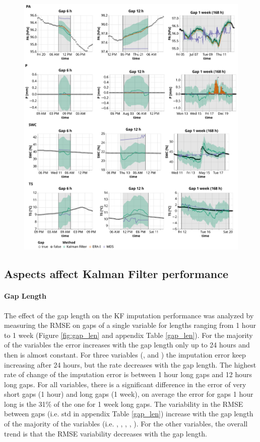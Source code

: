 \documentclass{article}
\let\Oldsubsection\subsection
\renewcommand{\subsection}{\FloatBarrier\Oldsubsection}
\begin{document}
\begin{figure}
\centerline{\includegraphics[width=5.7in]{timeseries_2}}
\caption{}
\label{fig:ts_1-2}
\end{figure}
\restoregeometry


\subsection{Aspects affect Kalman Filter performance}

\paragraph{Gap Length} The effect of the gap length on the KF imputation performance was analyzed by measuring the RMSE on gaps of a single variable for lengths ranging from 1 hour to 1 week (Figure \ref{fig:gap_len} and appendix Table \ref{gap_len}). For the majority of the variables the error increases with the gap length only up to 24 hours and then is almost constant. For three variables (,  and ) the imputation error keep increasing after 24 hours, but the rate decreases with the gap length. The highest rate of change of the imputation error is between 1 hour long gaps and 12 hours long gaps.
For all variables, there is a significant difference in the error of very short gaps (1 hour) and long gaps (1 week), on average the error for gaps 1 hour long is the 31\% of the one for 1 week long gaps.
The variability in the RMSE between gaps (i.e. std in appendix Table \ref{gap_len}) increase with the gap length of the majority of the variables (i.e. , , , , ). For the other variables, the overall trend is that the RMSE variability decreases with the gap length.
\end{document}
